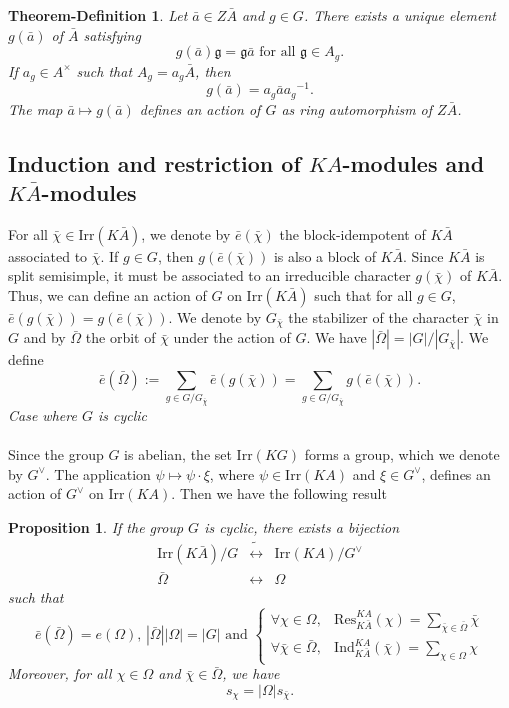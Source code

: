 \documentclass[10pt,a4paper,titlepage]{article}
\newtheorem{proposition}[theorem]{Proposition}
\newtheorem{thedef}[theorem]{Theorem-Definition}
\begin{document}
\begin{thedef}\label{action of G on ZA}
Let $\bar{a} \in Z\bar{A}$ and $g \in G$. There exists a unique
element $g(\bar{a})$ of $\bar{A}$ satisfying
$$g(\bar{a})\mathfrak{g}=\mathfrak{g}\bar{a} \textrm{ for all } \mathfrak{g} \in
A_g.$$ If $a_g \in A^\times$ such that
$A_g=a_g\bar{A}$, then $$g(\bar{a})=a_g\bar{a}{a_g}^{-1}.$$
The map $\bar{a} \mapsto g(\bar{a})$ defines an action of $G$ as
ring automorphism of $Z\bar{A}$.
\end{thedef}


\subsection*{\normalsize Induction and restriction of $KA$-modules and
$K\bar{A}$-modules}


For all $\bar{\chi} \in \mathrm{Irr}(K\bar{A})$, we denote by
$\bar{e}(\bar{\chi})$ the block-idempotent of $K\bar{A}$ associated to
$\bar{\chi}$. If $g \in G$, then
$g(\bar{e}(\bar{\chi}))$ is also a block of $K\bar{A}$. 
Since
$K\bar{A}$ is split semisimple, it must be associated to an
irreducible character $g(\bar{\chi})$ of $K\bar{A}$. Thus, we can
define an action of $G$ on $\mathrm{Irr}(K\bar{A})$ such that for
all $g \in G$, $\bar{e}(g(\bar{\chi}))=g(\bar{e}(\bar{\chi}))$. We
denote by $G_{\bar{\chi}}$ the stabilizer of the character $\bar{\chi}$ in $G$ and by
$\bar{\Omega}$ the orbit of $\bar{\chi}$ under the action of $G$. We have
$|\bar{\Omega}|=|G|/|G_{\bar{\chi}}|$. We define
$$\bar{e}(\bar{\Omega}):=\sum_{g \in
G/G_{\bar{\chi}}}\bar{e}(g(\bar{\chi}))= \sum_{g \in
G/G_{\bar{\chi}}}g(\bar{e}(\bar{\chi})).$$ $ $\\
\emph{Case where $G$ is cyclic}\\
\\
Since the group $G$ is abelian, the set $\mathrm{Irr}(KG)$ forms a
group, which we denote by $G^\vee$. The application $\psi \mapsto
\psi \cdot \xi$, where $\psi \in \mathrm{Irr}(KA)$ and $\xi \in
G^\vee$, defines an action of $G^\vee$ on $\mathrm{Irr}(KA)$.
Then we have the following result

\begin{proposition}\label{1.42}
If the group $G$ is cyclic, there exists a bijection
$$\begin{array}{ccc}
    \mathrm{Irr}(K\bar{A})/G & \tilde{\leftrightarrow} & \mathrm{Irr}(KA)/G^\vee \\
    \bar{\Omega} & \leftrightarrow & \Omega
  \end{array}$$
such that
$$\bar{e}(\bar{\Omega})=e(\Omega),\, |\bar{\Omega}||\Omega|=|G| \textrm{ and }
\left\{
  \begin{array}{ll}
    \forall \chi \in \Omega, & \mathrm{Res}_{K\bar{A}}^{KA}(\chi)=\sum_{\bar{\chi} \in \bar{\Omega}}\bar{\chi}\\
    \forall \bar{\chi} \in \bar{\Omega}, &\mathrm{Ind}_{K\bar{A}}^{KA}(\bar{\chi})=\sum_{\chi \in \Omega}\chi
  \end{array}
\right.
$$
Moreover, for all $\chi \in \Omega$ and $\bar{\chi} \in
\bar{\Omega}$, we have
$$s_\chi = |\Omega| s_{\bar{\chi}}.$$
\end{proposition}
\end{document}
